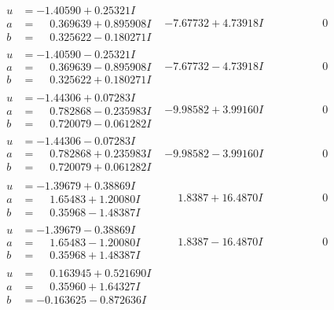 \documentclass[1p]{elsarticle_modified}
\theoremstyle{definition}
\begin{document}
$$\begin{array}{c|c|c}
\begin{aligned}
u &= -1.40590 + 0.25321 I \\
a &= \phantom{-}0.369639 + 0.895908 I \\
b &= \phantom{-}0.325622 - 0.180271 I\end{aligned}
 & -7.67732 + 4.73918 I & \phantom{-0.000000 } 0 \\ \hline\begin{aligned}
u &= -1.40590 - 0.25321 I \\
a &= \phantom{-}0.369639 - 0.895908 I \\
b &= \phantom{-}0.325622 + 0.180271 I\end{aligned}
 & -7.67732 - 4.73918 I & \phantom{-0.000000 } 0 \\ \hline\begin{aligned}
u &= -1.44306 + 0.07283 I \\
a &= \phantom{-}0.782868 - 0.235983 I \\
b &= \phantom{-}0.720079 - 0.061282 I\end{aligned}
 & -9.98582 + 3.99160 I & \phantom{-0.000000 } 0 \\ \hline\begin{aligned}
u &= -1.44306 - 0.07283 I \\
a &= \phantom{-}0.782868 + 0.235983 I \\
b &= \phantom{-}0.720079 + 0.061282 I\end{aligned}
 & -9.98582 - 3.99160 I & \phantom{-0.000000 } 0 \\ \hline\begin{aligned}
u &= -1.39679 + 0.38869 I \\
a &= \phantom{-}1.65483 + 1.20080 I \\
b &= \phantom{-}0.35968 - 1.48387 I\end{aligned}
 & \phantom{-}1.8387 + 16.4870 I & \phantom{-0.000000 } 0 \\ \hline\begin{aligned}
u &= -1.39679 - 0.38869 I \\
a &= \phantom{-}1.65483 - 1.20080 I \\
b &= \phantom{-}0.35968 + 1.48387 I\end{aligned}
 & \phantom{-}1.8387 - 16.4870 I & \phantom{-0.000000 } 0 \\ \hline\begin{aligned}
u &= \phantom{-}0.163945 + 0.521690 I \\
a &= \phantom{-}0.35960 + 1.64327 I \\
b &= -0.163625 - 0.872636 I\end{aligned}

\end{array}$$
\end{document}
